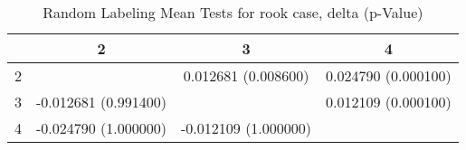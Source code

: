 \begin{table}
\caption{Random Labeling Mean Tests for rook case,  delta (p-Value)}
\label{randomLabelTable}
\begin{tabular}{|c||c|c|c|}
\hline
&2&3&4\\
\hline
\hline
2& & 0.012681 (0.008600)& 0.024790 (0.000100)\\
\hline
3& -0.012681 (0.991400)& & 0.012109 (0.000100)\\
\hline
4& -0.024790 (1.000000)& -0.012109 (1.000000)& \\
\hline
\end{tabular} \end{table}






